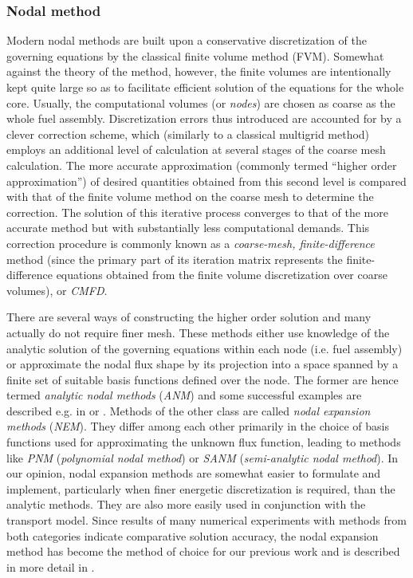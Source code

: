\subsubsection{Nodal method}\label{sec:Intro1121}
Modern nodal methods are built upon a conservative discretization of the governing equations by the classical finite
volume method (FVM). Somewhat against the theory of the method, however, the finite volumes are intentionally kept quite
large so as to facilitate efficient solution of the equations for the whole core. Usually, the computational volumes (or
\textit{nodes}) are chosen as coarse as the whole fuel assembly. Discretization errors thus introduced are accounted for
by a clever correction scheme, which (similarly to a classical multigrid method) employs an additional level of
calculation at several stages of the coarse mesh calculation. The more accurate approximation (commonly termed ``higher
order approximation'') of desired quantities obtained from this second level is compared with that of the finite volume
method on the coarse mesh to determine the correction. The solution of this iterative process converges to that of the
more accurate method but with substantially less computational demands. This correction procedure is commonly known as a
\textit{coarse-mesh, finite-difference} method (since the primary part of its iteration matrix represents the
finite-difference equations obtained from the finite volume discretization over coarse volumes), or
\textit{CMFD}.%

There are several ways of constructing the higher order solution and many actually do not require finer mesh. These
methods either use knowledge of the analytic solution of the governing equations within each node (i.e. fuel assembly)
or approximate the nodal flux shape by its projection into a space spanned by a finite set of suitable basis functions
defined over the node. The former are hence termed \textit{analytic nodal methods} (\textit{ANM}) and some successful
examples are described e.g. in \cite{bib:GrundmannDYN3D} or \cite{bib:ChoAFEN}.
Methods of the other class are called \textit{nodal expansion methods} (\textit{NEM}). They differ among each other
primarily in the choice of basis functions used for approximating the unknown flux function, leading to methods like
\textit{PNM} (\textit{polynomial nodal method}) or \textit{SANM} (\textit{semi-analytic nodal method}). In our opinion,
nodal expansion methods are somewhat easier to formulate and implement, particularly when finer energetic discretization
is required, than the analytic methods. They are also more easily used in conjunction with the transport model. Since
results of many numerical experiments with methods from both categories indicate comparative solution accuracy, the
nodal expansion method has become the method of choice for our previous work and is described in more detail in
\cite{bib:HanusBP}.

